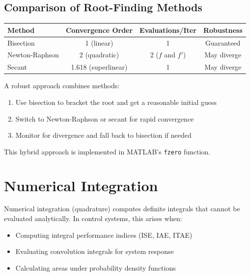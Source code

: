 \subsection{Comparison of Root-Finding Methods}

\begin{center}
\begin{tabular}{lccc}
\toprule
\textbf{Method} & \textbf{Convergence Order} & \textbf{Evaluations/Iter} & \textbf{Robustness} \\
\midrule
Bisection & 1 (linear) & 1 & Guaranteed \\
Newton-Raphson & 2 (quadratic) & 2 ($f$ and $f'$) & May diverge \\
Secant & 1.618 (superlinear) & 1 & May diverge \\
\bottomrule
\end{tabular}
\end{center}

\begin{keyconceptbox}[title=Practical Root-Finding Strategy]
A robust approach combines methods:
\begin{enumerate}
    \item Use bisection to bracket the root and get a reasonable initial guess
    \item Switch to Newton-Raphson or secant for rapid convergence
    \item Monitor for divergence and fall back to bisection if needed
\end{enumerate}
This hybrid approach is implemented in MATLAB's \texttt{fzero} function.
\end{keyconceptbox}

\section{Numerical Integration}
\label{sec:numerical_integration}

Numerical integration (quadrature) computes definite integrals that cannot be evaluated analytically. In control systems, this arises when:
\begin{itemize}
    \item Computing integral performance indices (ISE, IAE, ITAE)
    \item Evaluating convolution integrals for system response
    \item Calculating areas under probability density functions
\end{itemize}

